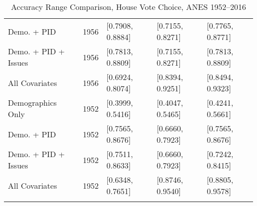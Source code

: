 \begin{longtable}{lrlll}
  Demo. + PID & 1956 & [0.7908, 0.8884] & [0.7155, 0.8271] & [0.7765, 0.8771] \\ 
  Demo. + PID + Issues & 1956 & [0.7813, 0.8809] & [0.7155, 0.8271] & [0.7813, 0.8809] \\ 
  All Covariates & 1956 & [0.6924, 0.8074] & [0.8394, 0.9251] & [0.8494, 0.9323] \\ 
  Demographics Only & 1952 & [0.3999, 0.5416] & [0.4047, 0.5465] & [0.4241, 0.5661] \\ 
  Demo. + PID & 1952 & [0.7565, 0.8676] & [0.6660, 0.7923] & [0.7565, 0.8676] \\ 
  Demo. + PID + Issues & 1952 & [0.7511, 0.8633] & [0.6660, 0.7923] & [0.7242, 0.8415] \\ 
  All Covariates & 1952 & [0.6348, 0.7651] & [0.8746, 0.9540] & [0.8805, 0.9578] \\ 
   \bottomrule
\caption{Accuracy Range Comparison, House Vote Choice, ANES 1952--2016} 
\label{tab:ANES_house_accuracy}
\end{longtable}
